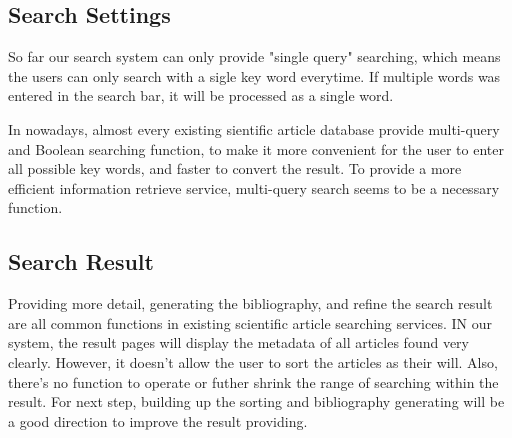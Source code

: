 \subsection{Search Settings}
So far our search system can only provide "single query" searching, which means the users can only search with a sigle key word everytime.
If multiple words was entered in the search bar, it will be processed as a single word.

In nowadays, almost every existing sientific article database provide multi-query and Boolean searching function,
to make it more convenient for the user to enter all possible key words,
and faster to convert the result.
To provide a more efficient information retrieve service,
multi-query search seems to be a necessary function.

\subsection{Search Result}
Providing more detail, generating the bibliography, and refine the search result are all common functions in existing scientific article searching services.
IN our system, the result pages will display the metadata of all articles found very clearly.
However, it doesn't allow the user to sort the articles as their will. Also,
there's no function to operate or futher shrink the range of searching within the result.
For next step,
building up the sorting and bibliography generating will be a good direction to improve the result providing.

